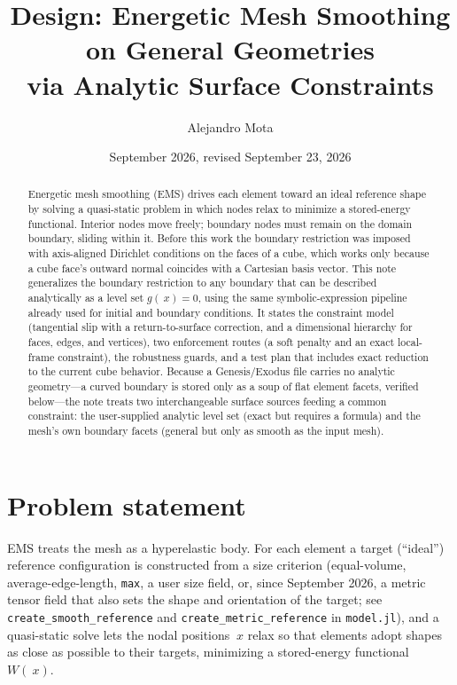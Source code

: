 \documentclass[11pt]{article}
\title{Design: Energetic Mesh Smoothing on General Geometries\\
via Analytic Surface Constraints}
\author{Alejandro Mota}
\date{September 2026, revised September 23, 2026}
\newcommand{\code}[1]{\texttt{#1}}
\begin{document}
\maketitle

\begin{abstract}
Energetic mesh smoothing (EMS) drives each element toward an ideal reference
shape by solving a quasi-static problem in which nodes relax to minimize a
stored-energy functional. Interior nodes move freely; boundary nodes must
remain on the domain boundary, sliding within it. Before this work the boundary
restriction was imposed with axis-aligned Dirichlet conditions on the faces of a
cube, which works only because a cube face's outward normal coincides with a
Cartesian basis vector. This note generalizes the boundary restriction to any
boundary that can be described analytically as a level set $g(~x)=0$, using the
same symbolic-expression pipeline already used for initial and boundary
conditions. It states the constraint model (tangential slip with a
return-to-surface correction, and a dimensional hierarchy for faces, edges, and
vertices), two enforcement routes (a soft penalty and an exact local-frame
constraint), the robustness guards, and a test plan that includes exact
reduction to the current cube behavior. Because a Genesis/Exodus file carries no
analytic geometry---a curved boundary is stored only as a soup of flat element
facets, verified below---the note treats two interchangeable surface sources
feeding a common constraint: the user-supplied analytic level set (exact but
requires a formula) and the mesh's own boundary facets (general but only as
smooth as the input mesh).
\end{abstract}

\section{Problem statement}

EMS treats the mesh as a hyperelastic body. For each element a target
(``ideal'') reference configuration is constructed from a size criterion
(equal-volume, average-edge-length, \code{max}, a user size field, or, since
September 2026, a metric tensor field that also sets the shape and
orientation of the target; see \code{create\_smooth\_reference} and
\code{create\_metric\_reference} in \code{model.jl}), and a quasi-static solve
lets the nodal positions $~x$ relax so that elements adopt shapes as close as
possible to their targets, minimizing a stored-energy functional $W(~x)$.
\end{document}
